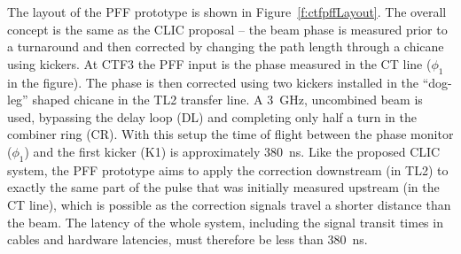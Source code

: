 
The layout of the PFF prototype is shown in Figure~\ref{f:ctfpffLayout}. The overall concept is the same as the CLIC proposal -- the beam phase is measured prior to a turnaround and then corrected by changing the path length through a chicane using kickers. At CTF3 the PFF input is the phase measured in the CT line (\(\phi_1\) in the figure). The phase is then corrected using two kickers installed in the ``dog-leg'' shaped chicane in the TL2 transfer line.  A 3~GHz, uncombined beam is used, bypassing the delay loop (DL) and completing only half a turn in the combiner ring (CR). With this setup the time of flight between the phase monitor (\(\phi_1\)) and the first kicker (K1) is approximately 380~ns. Like the proposed CLIC system, the PFF prototype aims to apply the correction downstream (in TL2) to exactly the same part of the pulse that was initially measured upstream (in the CT line), which is possible as the correction signals travel a shorter distance than the beam. The latency of the whole system, including the signal transit times in cables and hardware latencies, must therefore be less than 380~ns.




